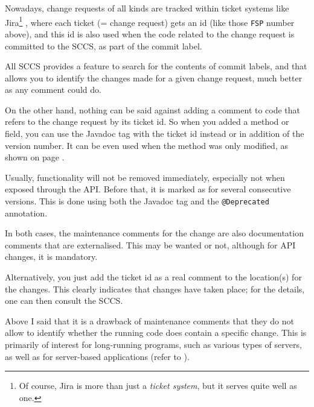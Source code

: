 Nowadays, change requests of all kinds are tracked within ticket systems like Jira\footnote{Of course, Jira is more than just a \textit{ticket system}, but it serves quite well as one.} \autocite{AtlassianJira}, where each ticket (= change request) gets an id (like those \texttt{FSP} number above), and this id is also used when the code related to the change request is committed to the SCCS, as part of the commit label.

All SCCS provides a feature to search for the contents of commit labels, and that allows you to identify the changes made for a given change request, much better as any comment could do.

On the other hand, nothing can be said against adding a comment to code that refers to the change request by its ticket id. So when you added a method or field, you can use the Javadoc tag  with the ticket id instead or in addition of the version number. It can be even used when the method was only modified, as shown on page \pageref{sec:TagSince}.

Usually, functionality will not be removed immediately, especially not when exposed through the API. Before that, it is marked as  for several consecutive versions. This is done using both the  Javadoc tag and the \lstinline|@Deprecated| annotation.

In both cases, the maintenance comments for the change are also documentation comments that are externalised. This may be wanted or not, although for API changes, it is mandatory.

Alternatively, you just add the ticket id as a real comment to the location(s) for the changes. This clearly indicates that changes have taken place; for the details, one can then consult the SCCS. 
 
Above I said that it is a drawback of maintenance comments that they do not allow to identify whether the running code does contain a specific change. This is primarily of interest for long-running programs, such as various types of servers, as well as for server-based applications (refer to ).

